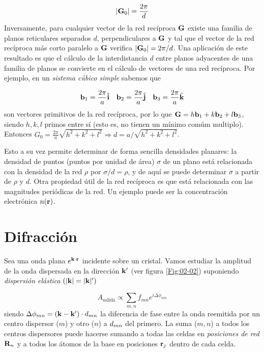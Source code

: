 \begin{equation}
|\mathbf{G}_0| = \frac{2\pi}{d} \label{Ec:02-01-05}
\end{equation}
Inversamente, para cualquier vector de la red recíproca $\mathbf{G}$ existe una familia de planos reticulares separados $d$, perpendiculares a $\mathbf{G}$ y tal que el vector de la red recíproca más corto paralelo a $\mathbf{G}$ verifica $|\mathbf{G}_0|=2\pi/d$. Una aplicación de este resultado es que el cálculo de la interdistancia $d$ entre planos adyacentes de una familia de planos se convierte en el cálculo de vectores de una red recíproca. Por ejemplo, en un \textit{sistema cúbico simple} sabemos que 

\begin{equation*}
    \mathbf{b}_1 = \frac{2\pi}{a} \hat{\mathbf{i}} \quad \mathbf{b}_2 = \frac{2\pi}{a} \hat{\mathbf{j}} \quad \mathbf{b}_3 = \frac{2\pi}{a} \hat{\mathbf{k}}
\end{equation*}
son vectores primitivos de la red recíproca, por lo que $\mathbf{G}=h\mathbf{b}_1+k\mathbf{b}_2+l\mathbf{b}_3$, siendo $h,k,l$ primos entre sí (esto es, no tienen un mínimo comúm multiplo). Entonces $G_0=\frac{2\pi}{a} \sqrt{h^2 + k^2 + l^2} \Rightarrow d = a/ \sqrt{h^2 + k^2 + l^2}$. 

Esto a su vez permite determinar de forma sencilla densidades planares: la densidad de puntos (puntos por unidad de área) $\sigma$ de un plano está relacionada con la densidad de la red $\rho$ por $\sigma/d = \rho$, y de aquí se puede determinar $\sigma$ a partir de $\rho$ y $d$. Otra propiedad útil de la red recíproca es que está relacionada con las magnitudes periódicas de la red. Un ejemplo puede ser la concentración electrónica $n(\mathbf{r})$.

\section{Difracción}

Sea una onda plana $e^{\mathbf{k} \cdot \mathbf{r}}$ incidente sobre un cristal. Vamos estudiar la amplitud de la onda dispersada en la dirección $\mathbf{k}'$ (ver figura \ref{Fig:02-02}) suponiendo \textit{dispersión elástica} $(|\mathbf{k}|=|\mathbf{k}|')$

\begin{equation}
    A_{\text{salida}} \propto \sum_{m,n} f_{mn} e^{i \Delta \phi_{mn}}
\end{equation}
siendo $\Delta \phi_{mn} = (\mathbf{k} - \mathbf{k}') \cdot \mathbf{}d_{mn}$ la diferencia de fase entre la onda reemitida por un centro dispersor ($m$) y otro ($n$) a $\mathbf{}d_{mn}$ del primero. La suma ($m,n$) a todos los centros dispersores puede hacerse sumando a todas las celdas en \textit{posiciones de red} $\mathbf{R}_n$ y a todos los átomos de la base en posiciones $\mathbf{r}_j$ dentro de cada celda. 

